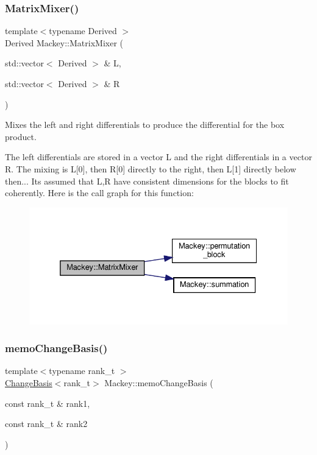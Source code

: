 \mbox{\label{namespaceMackey_a993f40280c4b6eae358e8c1bb4daa290}} 
\subsubsection{\texorpdfstring{Matrix\+Mixer()}{MatrixMixer()}}
{\footnotesize\ttfamily template$<$typename Derived $>$ \\
Derived Mackey\+::\+Matrix\+Mixer (\begin{DoxyParamCaption}\item[{std\+::vector$<$ Derived $>$ \&}]{L,  }\item[{std\+::vector$<$ Derived $>$ \&}]{R }\end{DoxyParamCaption})}



Mixes the left and right differentials to produce the differential for the box product. 

The left differentials are stored in a vector L and the right differentials in a vector R. The mixing is L\mbox{[}0\mbox{]}, then R\mbox{[}0\mbox{]} directly to the right, then L\mbox{[}1\mbox{]} directly below then... It\textquotesingle{}s assumed that L,R have consistent dimensions for the blocks to fit coherently. Here is the call graph for this function\+:\nopagebreak
\begin{figure}[H]
\begin{center}
\leavevmode
\includegraphics[width=332pt]{namespaceMackey_a993f40280c4b6eae358e8c1bb4daa290_cgraph}
\end{center}
\end{figure}
\mbox{\label{namespaceMackey_a70952d513d08b47bc282441a3e9d732c}} 
\subsubsection{\texorpdfstring{memo\+Change\+Basis()}{memoChangeBasis()}}
{\footnotesize\ttfamily template$<$typename rank\+\_\+t $>$ \\
\hyperlink{classMackey_1_1ChangeBasis}{Change\+Basis}$<$rank\+\_\+t$>$ Mackey\+::memo\+Change\+Basis (\begin{DoxyParamCaption}\item[{const rank\+\_\+t \&}]{rank1,  }\item[{const rank\+\_\+t \&}]{rank2 }\end{DoxyParamCaption})}



